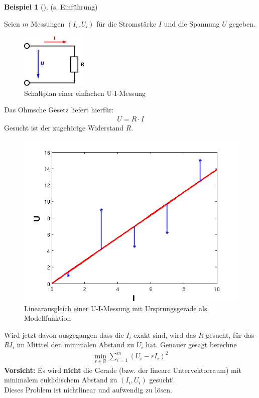\documentclass[ngerman,fontsize=11pt, paper=a4, parskip=half, titlepage=true, toc=bib]{scrbook}
\theoremstyle{definition}
\newtheorem{Bsp}[Def]{Beispiel}
\theoremstyle{plain}
\newcommand{\R}{\mathds{R}}
\newcommand{\subsectione}[1]{\addtocounter{Def}{1}\subsection{#1}}
\newenvironment{Bspe}[1][]{ %
  \begin{Bsp}[#1]
  }
  {
  \end{Bsp}
  \addtocounter{subsection}{1}
}
\begin{document}
\begin{Bspe}
  (s. Einführung)
  
  Seien $m$ Messungen $(I_i, U_i)$ für die Stromstärke $I$ und die Spannung $U$ gegeben. \\
  
  \begin{figure}
    \parbox{\linewidth}{
      \centering
      \includegraphics{images/ohmsche.jpeg}
    }
    \caption{Schaltplan einer einfachen U-I-Messung}
  \end{figure}
  
  Das Ohmsche Gesetz liefert hierfür:
  \begin{gather*}
    U=R\cdot I
  \end{gather*}
  Gesucht ist der zugehörige Widerstand $R$.\\
  
  \begin{figure}
    \parbox{\linewidth}{
      \centering
      \includegraphics[width=0.5\linewidth]{images/linausgl2.png}
    }
    \caption{Linearausgleich einer U-I-Messung mit Ursprungsgerade als Modellfunktion}
  \end{figure}
  
  Wird jetzt davon ausgegangen dass die $I_i$ exakt sind, wird das $R$ gesucht, 
  für das $RI_i$ im Mitttel den minimalen Abstand zu $U_i$ hat.
  Genauer gesagt berechne
  \begin{gather*}
    \min_{r\in\R} \sum_{i=1}^{m}(U_i-rI_i)^2
  \end{gather*}
  \textbf{Vorsicht: } Es wird \textbf{nicht} die Gerade (bzw. der lineare Untervektorraum) mit 
  minimalem euklidischem Abstand zu $(I_i,U_i)$ gesucht! \\
  Dieses Problem ist nichtlinear und aufwendig zu lösen.
\end{Bspe}
\end{document}
